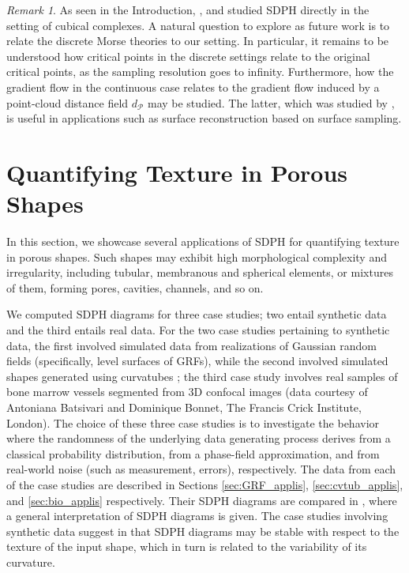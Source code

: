 \documentclass[11pt]{article}
\theoremstyle{plain}
\theoremstyle{definition}
\theoremstyle{remark}
\newtheorem{rmk}{Remark}
\begin{document}
\begin{rmk}
As seen in the Introduction, \cite{delgado-friedrichs_skeletonization_2015}, \cite{herring_topological_2019} and \cite{moon_statistical_2019} studied SDPH directly in the setting of cubical complexes. A natural question to explore as future work is to relate the discrete Morse theories \citep{banchoff_critical_1967,forman_morse_1998, bauer_persistence_2011, lewiner_critical_2013, bloch_polyhedral_2013, saucan_discrete_2020} to our setting. In particular, it remains to be understood how critical points in the discrete settings relate to the original critical points, as the sampling resolution goes to infinity. Furthermore, how the gradient flow in the continuous case 
relates to the gradient flow induced by a point-cloud distance field $d_\mathcal{P}$ may be studied. The latter, which was studied by \cite{giesen_medial_2006, giesen_flow_2008, giesen_parallel_2013}, is useful in applications such as surface reconstruction based on surface sampling.
\end{rmk}

\section{Quantifying Texture in Porous Shapes}
\label{sec:quantifying_texture_applis}

In this section, we showcase several applications of SDPH for quantifying texture in porous shapes. Such shapes may exhibit high morphological complexity and irregularity, including tubular, membranous and spherical elements, or mixtures of them, forming pores, cavities, channels, and so on.

We computed SDPH diagrams for three case studies; two entail synthetic data and the third entails real data. 
 For the two case studies pertaining to synthetic data, the first involved simulated data from realizations of Gaussian random fields (specifically, level surfaces of GRFs), while the second involved simulated shapes generated using curvatubes \citep{song_generation_2021}; the third case study involves real samples of bone marrow vessels segmented from 3D confocal images (data courtesy of Antoniana Batsivari and Dominique Bonnet, The Francis Crick Institute, London).  The choice of these three case studies is to investigate the behavior where the randomness of the  underlying data generating process derives from a classical probability distribution, from a phase-field approximation, and from real-world noise (such as measurement, errors), respectively.  The data from each of the case studies are described in Sections \ref{sec:GRF_applis}, \ref{sec:cvtub_applis}, and \ref{sec:bio_applis} respectively. Their SDPH diagrams are compared in , where a general interpretation of SDPH diagrams is given. The case studies involving synthetic data suggest in  that SDPH diagrams may be stable with respect to the texture of the input shape, which in turn is related to the variability of its curvature.
\end{document}
